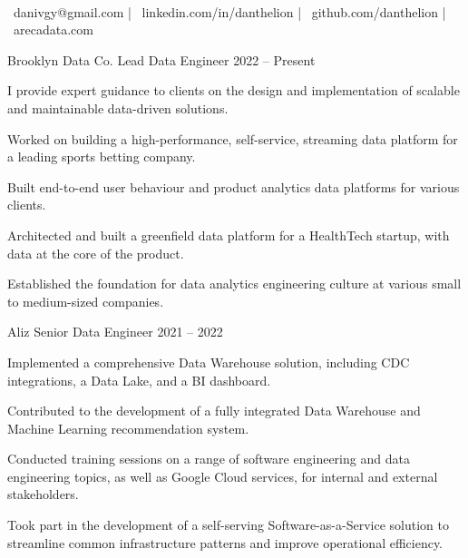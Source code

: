 \documentclass[]{awesome-cv}
\begin{document}
\begin{center}
	  \\
	\vspace{2mm}
	{\faEnvelope\ danivgy@gmail.com} | {\faLinkedin\ linkedin.com/in/danthelion} | {\faGithub\ github.com/danthelion} | {\faLink\ arecadata.com}
\end{center}
\begin{cventries}
	\cventry
	{Brooklyn Data Co.}
	{Lead Data Engineer}
	{2022 – Present}
	{}
	{\begin{cvitems}
		\item {I provide expert guidance to clients on the design and implementation of scalable and maintainable data-driven solutions.}
		\item {Worked on building a high-performance, self-service, streaming data platform for a leading sports betting company.}
		\item {Built end-to-end user behaviour and product analytics data platforms for various clients.}
		\item {Architected and built a greenfield data platform for a HealthTech startup, with data at the core of the product.}
		\item {Established the foundation for data analytics engineering culture at various small to medium-sized companies.}
		\end{cvitems}}
	\cventry
	{Aliz}
	{Senior Data Engineer}
	{2021 – 2022}
	{}
	{\begin{cvitems}
		\item {Implemented a comprehensive Data Warehouse solution, including CDC integrations, a Data Lake, and a BI dashboard.}
		\item {Contributed to the development of a fully integrated Data Warehouse and Machine Learning recommendation system.}
		\item {Conducted training sessions on a range of software engineering and data engineering topics, as well as Google Cloud services, for internal and external stakeholders.}
		\item {Took part in the development of a self-serving Software-as-a-Service solution to streamline common infrastructure patterns and improve operational efficiency.}
		\end{cvitems}}
	\cventry

\end{cventries}
\end{document}
